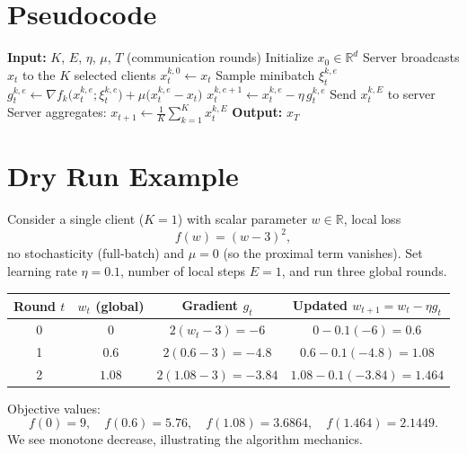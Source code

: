 \documentclass{article}
\begin{document}
\section*{Pseudocode}
\begin{algorithm}[H]
\caption{FedProx with Local SGD}
\begin{algorithmic}[1]
\State \textbf{Input:} $K$, $E$, $\eta$, $\mu$, $T$ (communication rounds)
\State Initialize $x_0\in\mathbb{R}^d$
    \State Server broadcasts $x_t$ to the $K$ selected clients
        \State $x_{t}^{k,0}\gets x_t$
            \State Sample minibatch $\xi_{t}^{k,e}$
            \State $g_{t}^{k,e}\gets \nabla f_k\!\bigl(x_{t}^{k,e};\xi_{t}^{k,e}\bigr)+\mu\bigl(x_{t}^{k,e}-x_t\bigr)$
            \State $x_{t}^{k,e+1}\gets x_{t}^{k,e}-\eta\, g_{t}^{k,e}$
        \EndFor
        \State Send $x_{t}^{k,E}$ to server
    \EndFor
    \State Server aggregates: $x_{t+1}\gets \frac{1}{K}\sum_{k=1}^{K}x_{t}^{k,E}$
\EndFor
\State \textbf{Output:} $x_T$
\end{algorithmic}
\end{algorithm}

\section*{Dry Run Example}
Consider a single client ($K=1$) with scalar parameter $w\in\mathbb{R}$, local loss
\[
f(w)=(w-3)^2,
\]
no stochasticity (full‑batch) and $\mu=0$ (so the proximal term vanishes).  
Set learning rate $\eta=0.1$, number of local steps $E=1$, and run three global rounds.

\begin{center}
\begin{tabular}{c|c|c|c}
Round $t$ & $w_t$ (global) & Gradient $g_t$ & Updated $w_{t+1}=w_t-\eta g_t$ \\ \hline
0 & $0$ & $2(w_t-3)= -6$ & $0-0.1(-6)=0.6$ \\
1 & $0.6$ & $2(0.6-3)= -4.8$ & $0.6-0.1(-4.8)=1.08$ \\
2 & $1.08$ & $2(1.08-3)= -3.84$ & $1.08-0.1(-3.84)=1.464$ \\
\end{tabular}
\end{center}

Objective values:
\[
f(0)=9,\quad f(0.6)=5.76,\quad f(1.08)=3.6864,\quad f(1.464)=2.1449.
\]
We see monotone decrease, illustrating the algorithm mechanics.
\end{document}
